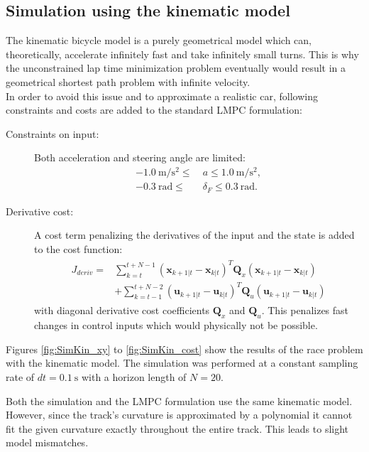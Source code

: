 \subsection{Simulation using the kinematic model}
The kinematic bicycle model is a purely geometrical model which can, theoretically, accelerate infinitely fast and take infinitely small turns. This is why the unconstrained lap time minimization problem eventually would result in a geometrical shortest path problem with infinite velocity.\\
In order to avoid this issue and to approximate a realistic car, following constraints and costs are added to the standard LMPC formulation:
\begin{description}
\item[Constraints on input:] Both acceleration and steering angle are limited:
\begin{align*}
-\SI{1.0}{\meter\per\square\second} \leq\  &a \leq \SI{1.0}{\meter\per\square\second},\\
-\SI{0.3}{\radian} \leq\ &\delta_F \leq \SI{0.3}{\radian}.
\end{align*}
\item[Derivative cost:] A cost term penalizing the derivatives of the input and the state is added to the cost function:
\begin{align}
\begin{split}
J_{deriv} = &\sum_{k=t}^{t+N-1} (\bm{x}_{k+1|t}-\bm{x}_{k|t})^T \bm{Q}_x (\bm{x}_{k+1|t}-\bm{x}_{k|t})\\
&+\sum_{k=t-1}^{t+N-2} (\bm{u}_{k+1|t}-\bm{u}_{k|t})^T \bm{Q}_u (\bm{u}_{k+1|t}-\bm{u}_{k|t})
\end{split}
\end{align}
with diagonal derivative cost coefficients $\bm{Q}_x$ and $\bm{Q}_u$. This penalizes fast changes in control inputs which would physically not be possible.
\end{description}
Figures \ref{fig:SimKin_xy} to \ref{fig:SimKin_cost} show the results of the race problem with the kinematic model. The simulation was performed at a constant sampling rate of $dt=\SI{0.1}{\second}$ with a horizon length of $N=20$.

Both the simulation and the LMPC formulation use the same kinematic model. However, since the track's curvature is approximated by a polynomial it cannot fit the given curvature exactly throughout the entire track. This leads to slight model mismatches.
